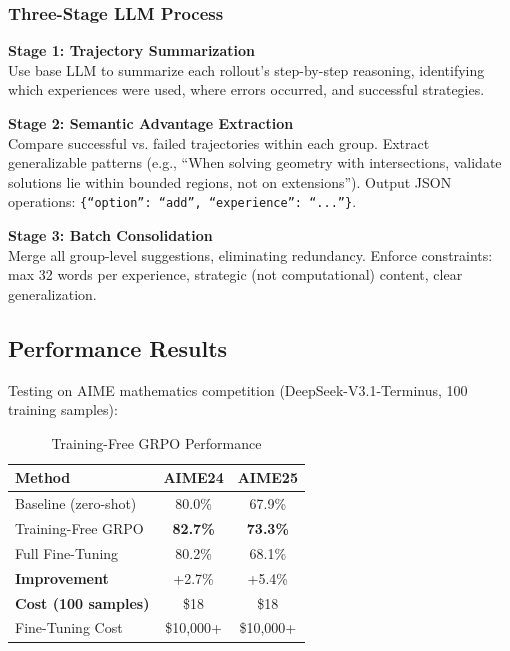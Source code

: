 \subsubsection{Three-Stage LLM Process}

\textbf{Stage 1: Trajectory Summarization} \\
Use base LLM to summarize each rollout's step-by-step reasoning, identifying which experiences were used, where errors occurred, and successful strategies.

\textbf{Stage 2: Semantic Advantage Extraction} \\
Compare successful vs. failed trajectories within each group. Extract generalizable patterns (e.g., ``When solving geometry with intersections, validate solutions lie within bounded regions, not on extensions''). Output JSON operations: \texttt{\{``option'': ``add'', ``experience'': ``...''\}}.

\textbf{Stage 3: Batch Consolidation} \\
Merge all group-level suggestions, eliminating redundancy. Enforce constraints: max 32 words per experience, strategic (not computational) content, clear generalization.

\subsection{Performance Results}

Testing on AIME mathematics competition (DeepSeek-V3.1-Terminus, 100 training samples):

\begin{table}[h]
\centering
\caption{Training-Free GRPO Performance}
\label{tab:grpo-performance}
\begin{tabular}{@{}lcc@{}}
\toprule
\textbf{Method} & \textbf{AIME24} & \textbf{AIME25} \\ \midrule
Baseline (zero-shot) & 80.0\% & 67.9\% \\
Training-Free GRPO & \textbf{82.7\%} & \textbf{73.3\%} \\
Full Fine-Tuning & 80.2\% & 68.1\% \\ \midrule
\textbf{Improvement} & +2.7\% & +5.4\% \\ \midrule
\textbf{Cost (100 samples)} & \$18 & \$18 \\
Fine-Tuning Cost & \$10,000+ & \$10,000+ \\
\bottomrule
\end{tabular}
\end{table}

